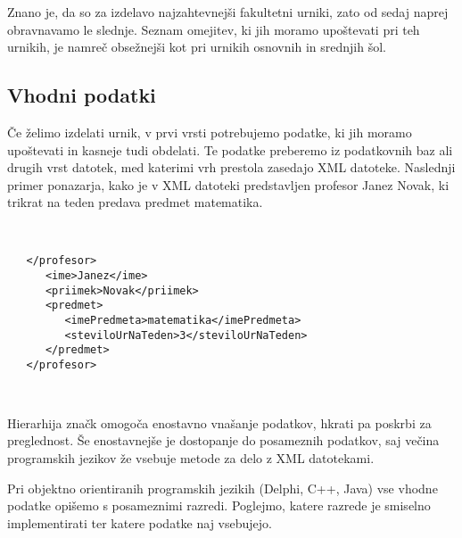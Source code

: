 \documentclass[a4paper, 10pt]{article}
\begin{document}
Znano je, da so za izdelavo najzahtevnejši fakultetni urniki, zato od sedaj naprej
obravnavamo le slednje. Seznam omejitev, ki jih moramo upoštevati pri teh urnikih,
je namreč obsežnejši kot pri urnikih osnovnih in srednjih šol.

\subsection{Vhodni podatki}

Če želimo izdelati urnik, v prvi vrsti potrebujemo podatke, ki jih moramo upoštevati in
kasneje tudi obdelati. Te podatke preberemo iz podatkovnih baz ali drugih vrst datotek,
med katerimi vrh prestola zasedajo XML datoteke. Naslednji primer ponazarja, kako je v
XML datoteki predstavljen profesor Janez Novak, ki trikrat na teden predava predmet
matematika.



\begin{verbatim}
   
   
   </profesor>
      <ime>Janez</ime>
      <priimek>Novak</priimek>
      <predmet>
         <imePredmeta>matematika</imePredmeta>
         <steviloUrNaTeden>3</steviloUrNaTeden>
      </predmet>
   </profesor>
   
   
\end{verbatim}

Hierarhija značk omogoča enostavno vnašanje podatkov, hkrati pa poskrbi za preglednost.
Še enostavnejše je dostopanje do posameznih podatkov, saj večina programskih jezikov že
vsebuje metode za delo z XML datotekami.

Pri objektno orientiranih programskih jezikih (Delphi, C++, Java) vse vhodne podatke
opišemo s posameznimi razredi. Poglejmo, katere razrede je smiselno implementirati ter
katere podatke naj vsebujejo.
\end{document}
